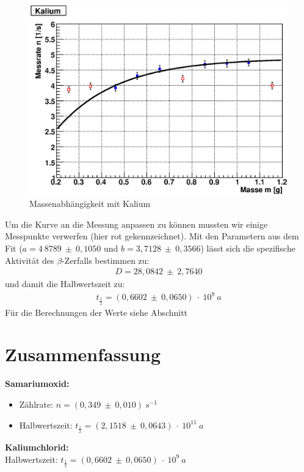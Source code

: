 \documentclass[12pt]{article}
\begin{document}
\begin{figure}[H]  
\centering
\includegraphics[width=0.9\linewidth]{pictures/kalium.eps}
\caption{Massenabhängigkeit mit Kalium}
\end{figure}

Um die Kurve an die Messung anpassen zu können mussten wir einige Messpunkte verwerfen (hier rot gekennzeichnet).
Mit den Parametern aus dem Fit ($a = 4~8789~\pm~0,1050$ und $b = 3,7128~\pm~0,3566$) lässt sich die spezifische Aktivität des $\beta$-Zerfalls bestimmen zu:
\begin{align*}
 D = 28,0842~\pm~2,7640
\end{align*}
und damit die Halbwertszeit zu:
\begin{align*}
 t_{\frac{1}{2}} = (0,6602~\pm~0,0650)~\cdot~10^9~a
\end{align*}
Für die Berechnungen der Werte siehe Abschnitt %
\newpage
\section{Zusammenfassung}
\textbf{Samariumoxid:} \\
\begin{itemize}
 \item Zählrate: $n = (0,349~\pm~0,010)~s^{-1}$
 \item Halbwertszeit: $t_{\frac{1}{2}} = (2,1518~\pm~0,0643)~\cdot~10^{11}~a$
\end{itemize}

\textbf{Kaliumchlorid:} \\
Halbwertszeit: $t_{\frac{1}{2}} = (0,6602~\pm~0,0650)~\cdot~10^9~a$\\
\end{document}
